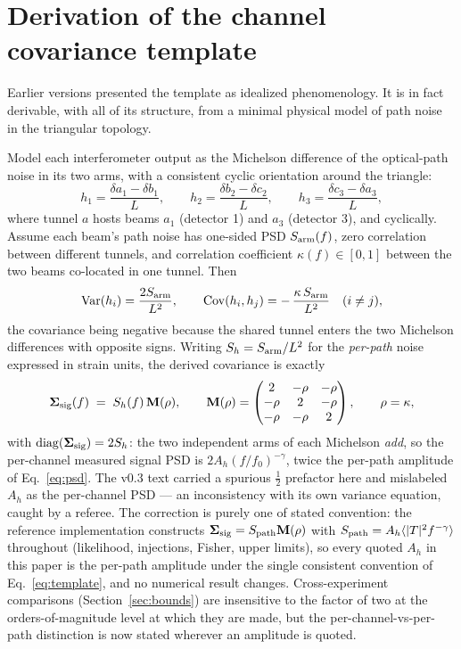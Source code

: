 \documentclass[11pt]{article}
\newcommand{\Ah}{A_h}
\newcommand{\Sh}{S_h}
\begin{document}
\section{Derivation of the channel covariance template}
\label{sec:derivation}

Earlier versions presented the template as idealized phenomenology. It is in fact derivable, with all of its structure, from a minimal physical model of path noise in the triangular topology.

Model each interferometer output as the Michelson difference of the optical-path noise in its two arms, with a consistent cyclic orientation around the triangle:
\begin{equation}
h_1 = \frac{\delta a_1 - \delta b_1}{L},\qquad
h_2 = \frac{\delta b_2 - \delta c_2}{L},\qquad
h_3 = \frac{\delta c_3 - \delta a_3}{L},
\end{equation}
where tunnel $a$ hosts beams $a_1$ (detector 1) and $a_3$ (detector 3), and cyclically. Assume each beam's path noise has one-sided PSD $S_{\rm arm}(f)$, zero correlation between different tunnels, and correlation coefficient $\kappa(f) \in [0,1]$ between the two beams co-located in one tunnel. Then
\begin{equation}
\mathrm{Var}(h_i) = \frac{2 S_{\rm arm}}{L^2},
\qquad
\mathrm{Cov}(h_i, h_j) = -\,\frac{\kappa\, S_{\rm arm}}{L^2}
\quad (i \ne j),
\end{equation}
the covariance being negative because the shared tunnel enters the two Michelson differences with opposite signs. Writing $\Sh = S_{\rm arm}/L^2$ for the \emph{per-path} noise expressed in strain units, the derived covariance is exactly
\begin{equation}
\bm{\Sigma}_{\rm sig}(f) \;=\; \Sh(f)\, \mathbf{M}(\rho),
\qquad
\mathbf{M}(\rho) = \begin{pmatrix} 2 & -\rho & -\rho \\ -\rho & 2 & -\rho \\ -\rho & -\rho & 2 \end{pmatrix},
\qquad \rho = \kappa,
\label{eq:template}
\end{equation}
with $\mathrm{diag}(\bm{\Sigma}_{\rm sig}) = 2\Sh$: the two independent arms of each Michelson \emph{add}, so the per-channel measured signal PSD is $2\Ah (f/f_0)^{-\gamma}$, twice the per-path amplitude of Eq.~\eqref{eq:psd}. The v0.3 text carried a spurious $\tfrac12$ prefactor here and mislabeled $\Ah$ as the per-channel PSD --- an inconsistency with its own variance equation, caught by a referee. The correction is purely one of stated convention: the reference implementation constructs $\bm{\Sigma}_{\rm sig} = S_{\rm path}\mathbf{M}(\rho)$ with $S_{\rm path} = \Ah\langle |T|^2 f^{-\gamma}\rangle$ throughout (likelihood, injections, Fisher, upper limits), so every quoted $\Ah$ in this paper is the per-path amplitude under the single consistent convention of Eq.~\eqref{eq:template}, and no numerical result changes. Cross-experiment comparisons (Section~\ref{sec:bounds}) are insensitive to the factor of two at the orders-of-magnitude level at which they are made, but the per-channel-vs-per-path distinction is now stated wherever an amplitude is quoted.
\end{document}

